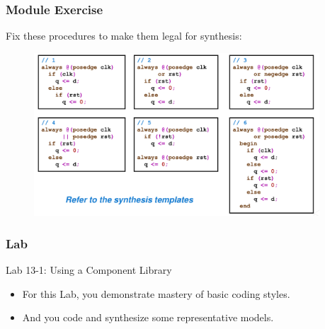 \documentclass[t, notes, xcolor=table]{beamer}
\begin{document}
\begin{frame}
\frametitle{Module Exercise}
Fix these procedures to make them legal for synthesis:
\begin{figure}
    \includegraphics[width=0.95\textwidth]{img/13_ex.png}
\end{figure}
\end{frame}

\begin{frame}
\frametitle{Lab}
Lab 13-1: Using a Component Library
\begin{itemize}
\item For this Lab, you demonstrate mastery of basic coding styles.
\item And you code and synthesize some representative models.
\end{itemize}
\end{frame}
\end{document}
